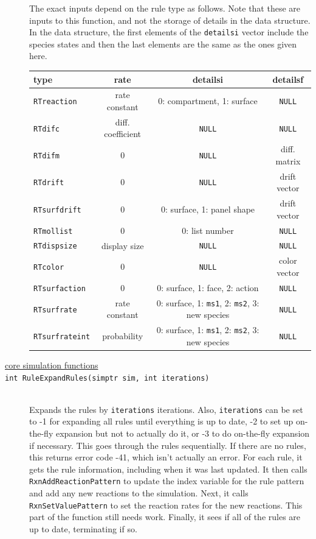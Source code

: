 \documentclass {scrbook}
\newcommand {\ttt} {\texttt}
\begin{document}
\begin{description}
The exact inputs depend on the rule type as follows. Note that these are inputs to this function, and not the storage of details in the data structure. In the data structure, the first elements of the \ttt{detailsi} vector include the species states and then the last elements are the same as the ones given here.

\begin{longtable}[c]{lccc}
type&rate&detailsi&detailsf\\
\hline
\ttt{RTreaction}&rate constant&0: compartment, 1: surface&\ttt{NULL}\\
\ttt{RTdifc}&diff. coefficient&\ttt{NULL}&\ttt{NULL}\\
\ttt{RTdifm}&0&\ttt{NULL}&diff. matrix\\
\ttt{RTdrift}&0&\ttt{NULL}&drift vector\\
\ttt{RTsurfdrift}&0&0: surface, 1: panel shape&drift vector\\
\ttt{RTmollist}&0&0: list number&\ttt{NULL}\\
\ttt{RTdispsize}&display size&\ttt{NULL}&\ttt{NULL}\\
\ttt{RTcolor}&0&\ttt{NULL}&color vector\\
\ttt{RTsurfaction}&0&0: surface, 1: face, 2: action&\ttt{NULL}\\
\ttt{RTsurfrate}&rate constant&0: surface, 1: \ttt{ms1}, 2: \ttt{ms2}, 3: new species&\ttt{NULL}\\
\ttt{RTsurfrateint}&probability&0: surface, 1: \ttt{ms1}, 2: \ttt{ms2}, 3: new species&\ttt{NULL}\\

\end{longtable}


\item[\underline{core simulation functions}]

\item[\ttt{int RuleExpandRules(simptr sim, int iterations)}]
\hfill \\
Expands the rules by \ttt{iterations} iterations. Also, \ttt{iterations} can be set to -1 for expanding all rules until everything is up to date, -2 to set up on-the-fly expansion but not to actually do it, or -3 to do on-the-fly expansion if necessary. This goes through the rules sequentially. If there are no rules, this returns error code -41, which isn't actually an error. For each rule, it gets the rule information, including when it was last updated. It then calls \ttt{RxnAddReactionPattern} to update the index variable for the rule pattern and add any new reactions to the simulation. Next, it calls \ttt{RxnSetValuePattern} to set the reaction rates for the new reactions. This part of the function still needs work. Finally, it sees if all of the rules are up to date, terminating if so.


\end{description}
\end{document}
